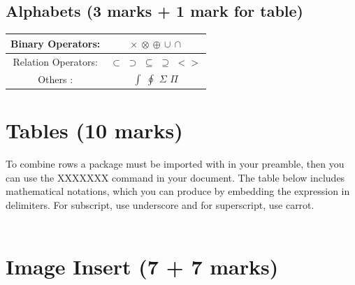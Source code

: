 \documentclass[12pt]{article}
\begin{document}
\subsection{Alphabets (3 marks + 1 mark for table)}
\medskip
\begin{center}

\begin{tabular}{ |c|c| }
\hline
Binary Operators: & $\times$   $\otimes$   $\oplus$   $\cup$   $\cap$  \\ [3 ex]
\hline
Relation Operators: & $\subset$   $\supset$    $\subseteq$    $\supseteq$    $< >$ \\ [3 ex]
\hline
Others : & $\int$   $\oint$    $\Sigma$    $\Pi$ \\ [3 ex]
\hline
\end{tabular}
\end{center}





\newpage



\section{Tables (10 marks)}
\indent
To combine rows a package must be imported with in your preamble, then you
can use the XXXXXXX command in your document. The table below includes
mathematical notations, which you can produce by embedding the expression
in $ $ delimiters. For subscript, use underscore and for superscript, use carrot. \\ \\
\newpage

\section{Image Insert (7 + 7 marks)}
\end{document}
